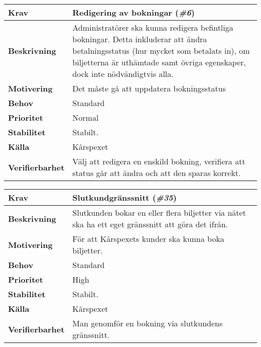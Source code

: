 \documentclass[a4paper, twoside, 11pt, titlepage]{article}
\begin{document}
		\begin{tabular} { p{2.6cm} p{12.5cm} }
			\hline
			\sffamily\textbf{Krav} & Redigering av bokningar (\emph{\#6})  \\
			\hline
			\sffamily\textbf{Beskrivning} & Administratörer ska kunna redigera befintliga bokningar. Detta inkluderar att ändra betalningsstatus (hur mycket som betalats in), om biljetterna är uthämtade samt övriga egenskaper, dock inte nödvändigtvis alla.  \\
			\hline
			\sffamily\textbf{Motivering} & Det måste gå att uppdatera bokningsstatus  \\
			\hline
			\sffamily\textbf{Behov} & Standard  \\
			\hline
			\sffamily\textbf{Prioritet} & Normal  \\
			\hline
			\sffamily\textbf{Stabilitet} & Stabilt.  \\
			\hline
			\sffamily\textbf{Källa} & Kårspexet  \\
			\hline
			\sffamily\textbf{Verifierbarhet} & Välj att redigera en enskild bokning, verifiera att status går att ändra och att den sparas korrekt.  \\
			\hline
		\end{tabular}
		\vspace{6mm}

		\begin{tabular} { p{2.6cm} p{12.5cm} }
			\hline
			\sffamily\textbf{Krav} & Slutkundgränssnitt (\emph{\#35})  \\
			\hline
			\sffamily\textbf{Beskrivning} & Slutkunden bokar en eller flera biljetter via nätet ska ha ett eget gränssnitt att göra det ifrån.  \\
			\hline
			\sffamily\textbf{Motivering} & För att Kårspexets kunder ska kunna boka biljetter.   \\
			\hline
			\sffamily\textbf{Behov} & Standard  \\
			\hline
			\sffamily\textbf{Prioritet} & High  \\
			\hline
			\sffamily\textbf{Stabilitet} & Stabilt.  \\
			\hline
			\sffamily\textbf{Källa} & Kårspexet  \\
			\hline
			\sffamily\textbf{Verifierbarhet} & Man genomför en bokning via slutkundens gränssnitt.   \\
			\hline
		\end{tabular}
		\vspace{6mm}
\end{document}
